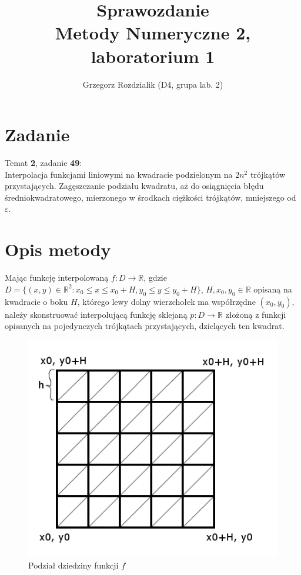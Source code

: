 \documentclass[12pt]{article}
\begin{document}
	\title{Sprawozdanie\\Metody Numeryczne 2, laboratorium 1}
	\author{Grzegorz Rozdzialik (D4, grupa lab. 2)}
	\maketitle	
	
	\section{Zadanie}
	{\Large Temat \textbf{2}, zadanie \textbf{49}:}\\
	Interpolacja funkcjami liniowymi na kwadracie podzielonym na $2n^2$ trójkątów przystających. Zagęszczanie podziału kwadratu, aż do osiągnięcia błędu średniokwadratowego, mierzonego w środkach ciężkości trójkątów, mniejszego od $\varepsilon$.
	
	\section{Opis metody}
	Mając funkcję interpolowaną $f: D \to \mathbb{R}$, gdzie $D = \{ (x, y) \in \mathbb{R}^2: x_0 \leq x \leq x_0 + H, y_0 \leq y \leq y_0 + H\}$, $H, x_0, y_0 \in \mathbb{R}$ opisaną na kwadracie o boku $H$, którego lewy dolny wierzchołek ma współrzędne $(x_0, y_0)$, należy skonstruować interpolującą funkcję sklejaną $p: D \to \mathbb{R}$ złożoną z funkcji opisanych na pojedynczych trójkątach przystających, dzielących ten kwadrat.
	
	\begin{figure}
		\centering
		\includegraphics[scale=0.8]{square-division.png}
		\caption{Podział dziedziny funkcji $f$}
	\end{figure}
	
\end{document}
